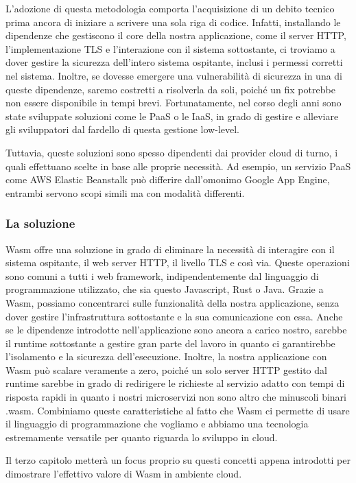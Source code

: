 L'adozione di questa metodologia comporta l'acquisizione di un debito tecnico prima ancora di iniziare a scrivere una
sola riga di codice. Infatti, installando le dipendenze che gestiscono il core della nostra applicazione, come il server
HTTP, l'implementazione TLS e l'interazione con il sistema sottostante, ci troviamo a dover gestire la sicurezza
dell'intero sistema ospitante, inclusi i permessi corretti nel sistema. Inoltre, se dovesse emergere una vulnerabilità
di sicurezza in una di queste dipendenze, saremo costretti a risolverla da soli, poiché un fix potrebbe non essere
disponibile in tempi brevi. Fortunatamente, nel corso degli anni sono state sviluppate soluzioni come le PaaS o le IaaS,
in grado di gestire e alleviare gli sviluppatori dal fardello di questa gestione low-level.

Tuttavia, queste soluzioni sono spesso dipendenti dai provider cloud di turno, i quali effettuano scelte in base alle
proprie necessità. Ad esempio, un servizio PaaS come AWS Elastic Beanstalk può differire dall'omonimo Google App Engine,
entrambi servono scopi simili ma con modalità differenti.

\subsubsection{La soluzione}
Wasm offre una soluzione in grado di eliminare la necessità di interagire con il sistema ospitante, il web server HTTP,
il livello TLS e così via. Queste operazioni sono comuni a tutti i web framework, indipendentemente dal linguaggio di
programmazione utilizzato, che sia questo Javascript, Rust o Java. Grazie a Wasm, possiamo concentrarci sulle
funzionalità della nostra applicazione, senza dover gestire l'infrastruttura sottostante e la sua comunicazione con
essa. Anche se le dipendenze introdotte nell'applicazione sono ancora a carico nostro, sarebbe il runtime sottostante a
gestire gran parte del lavoro in quanto ci garantirebbe l'isolamento e la sicurezza dell'esecuzione. Inoltre, la nostra
applicazione con Wasm può scalare veramente a zero, poiché un solo server HTTP gestito dal runtime sarebbe in grado di
redirigere le richieste al servizio adatto con tempi di risposta rapidi in quanto i nostri microservizi non sono altro
che minuscoli binari .wasm. Combiniamo queste caratteristiche al fatto che Wasm ci permette di usare il linguaggio di
programmazione che vogliamo e abbiamo una tecnologia estremamente versatile per quanto riguarda lo sviluppo in cloud.

Il terzo capitolo metterà un focus proprio su questi concetti appena introdotti per dimostrare l'effettivo valore di
Wasm in ambiente cloud.